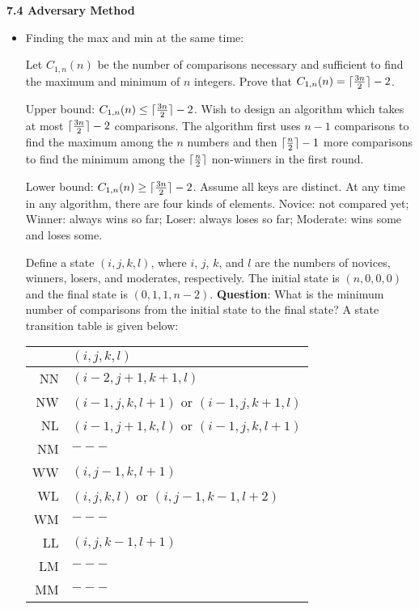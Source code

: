 \textbf{7.4 Adversary Method}
\begin{itemize}
    \item Finding the max and min at the same time:

    Let $C_{1,n}(n)$ be the number of comparisons necessary and
    sufficient to find the maximum and minimum of $n$ integers.
    Prove that $C_{1,n}(n)=\lceil{3n\over2}\rceil-2$.
    
    Upper bound: $C_{1,n}(n)\le\lceil{3n\over2}\rceil-2$. Wish
    to design an algorithm which takes at most $\lceil{3n\over2}\rceil-2$
    comparisons. The algorithm first uses $n-1$ comparisons to find the
    maximum among the $n$ numbers and then $\lceil{n\over2}\rceil-1$ 
    more comparisons to find the minimum among the $\lceil{n\over2}\rceil$
    non-winners in the first round.
    
    Lower bound: $C_{1,n}(n)\ge\lceil{3n\over2}\rceil-2$.
    Assume all keys are distinct. At any time in any algorithm,
    there are four kinds of elements.
    Novice: not compared yet; Winner: always wins so far; Loser: always loses so far; Moderate: wins some and loses some.
    
    Define a state $(i,j,k,l)$, where $i$, $j$, $k$, and $l$ are
    the numbers of novices, winners, losers, and moderates, respectively.
    The initial state is $(n,0,0,0)$ and the final state is $(0,1,1,n-2)$.
    \textbf{Question}: What is the minimum number of comparisons from the initial
    state to the final state? A state transition table is given below:
    
    \begin{center}
    \begin{tabular}{r|l}
    & $(i,j,k,l)$\\\hline
    NN & $(i-2,j+1,k+1,l)$\\
    NW & $(i-1,j,k,l+1)$ or $(i-1,j,k+1,l)$\\
    NL & $(i-1,j+1,k,l)$ or $(i-1,j,k,l+1)$\\
    NM & $---$\\
    WW & $(i,j-1,k,l+1)$\\
    WL & $(i,j,k,l)$ or $(i,j-1,k-1,l+2)$\\
    WM & $---$\\
    LL & $(i,j,k-1,l+1)$\\
    LM & $---$\\
    MM & $---$
    \end{tabular}
    \end{center}
    

\end{itemize}
